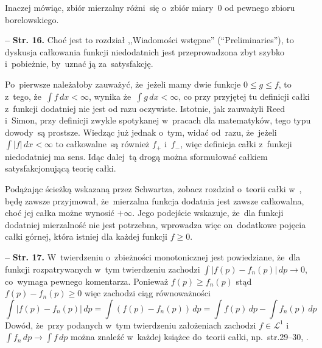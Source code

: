 \documentclass[a4paper,11pt]{article}
\newcommand{\spaceFour}{0.5em}
\newcommand{\mc}{\mathcal}
\newcommand{\ra}{\rightarrow}
\newcommand{\Lc}{\mc{L}}
\newcommand{\dk}{\, d} %
\newcommand{\Int}{\int\limits}
\newcommand{\IntCaD}[2] { \Int #1 \, d#2 } %
\newcommand{\LIj}{\Lc^{ 1 }}
\providecommand{\absj}[1]{\lvert #1 \rvert}
\newcommand{\tb}{\textbf}
\newcommand{\noi}{\noindent}
\newcommand{\start}{\noi \tb{--} {}}
\newcommand{\Str}[1]{\tb{Str. #1.}}
\begin{document}
Inaczej mówiąc, zbiór mierzalny różni~się o~zbiór miary~0 od pewnego
zbioru borelowskiego. %

\vspace{\spaceFour}


\start \Str{16} Choć jest to rozdział ,,Wiadomości wstępne''
(``Preliminaries''), to dyskusja całkowania funkcji niedodatnich jest
przeprowadzona zbyt szybko i~pobieżnie, by~uznać ją za~satysfakcję.

Po~pierwsze należałoby zauważyć, że~jeżeli mamy dwie funkcje
$0 \leq g \leq f$, to z~tego, że~$\IntCaD{ f }{ x } < \infty$, wynika
że~$\IntCaD{ g }{ x } < \infty$, co przy przyjętej tu definicji całki
z~funkcji dodatniej nie jest od razu oczywiste. Istotnie, jak
zauważyli Reed i~Simon, przy definicji zwykle spotykanej w~pracach dla
matematyków, tego typu dowody~są prostsze. Wiedząc już jednak o~tym,
widać od~razu, że~jeżeli $\IntCaD{ \absj{ f } }{ x } < \infty$ to
całkowalne~są również $f_{ + }$ i~$f_{ - }$, więc definicja całki
z~funkcji niedodatniej ma sens. Idąc dalej~tą drogą można sformułować
całkiem satysfakcjonującą teorię całki.

Podążając ścieżką wskazaną przez Schwartza, zobacz rozdział o~teorii
całki w~\cite{SchwartzKursAnalizyMatematycznej79}, będę zawsze
przyjmował, że~mierzalna funkcja dodatnia jest zawsze całkowalna, choć
jej całka możne wynosić $+\infty$. Jego podejście wskazuje, że~dla
funkcji dodatniej mierzalność nie jest potrzebna, wprowadza więc
on~dodatkowe pojęcia całki górnej, która istniej dla każdej funkcji
$f \geq 0$. %


\vspace{\spaceFour}


\start \Str{17} W~twierdzeniu o~zbieżności monotonicznej jest
powiedziane, że~dla funkcji rozpatrywanych w~tym twierdzeniu zachodzi
$\int | f( p ) - f_{ n }( p ) | \dk p \ra 0$, co~wymaga pewnego
komentarza. Ponieważ $f( p ) \geq f_{ n }( p )$ stąd
$f( p ) - f_{ n }( p ) \geq 0$ więc zachodzi ciąg równoważności
\begin{equation*}
  \IntCaD{ | f( p ) - f_{ n }( p ) | }{ p } = \IntCaD{ ( f( p )
    - f_{ n }( p ) ) }{ p } = \IntCaD{ f( p ) }{ p }
  - \IntCaD{ f_{ n }( p ) }{ p }
\end{equation*}
Dowód, że~przy podanych w~tym twierdzeniu założeniach zachodzi
$f \in \LIj$ i~$\IntCaD{ f_{ n } }{ p } \ra \IntCaD{ f }{ p }$ można
znaleźć w~każdej książce do~teorii całki, np.~str.29--30,
\cite{Rudin98}. %
\end{document}
